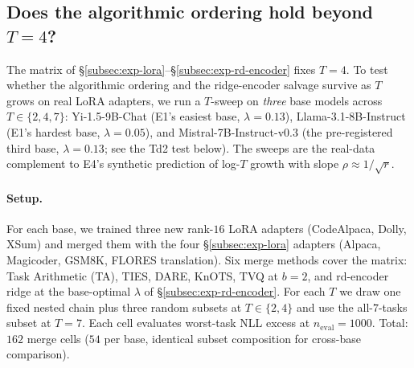 
\subsection{Does the algorithmic ordering hold beyond $T=4$?}
\label{subsec:exp-T-scaling}

The matrix of \S\ref{subsec:exp-lora}--\S\ref{subsec:exp-rd-encoder}
fixes $T=4$. To test whether the algorithmic ordering and the
ridge-encoder salvage survive as $T$ grows on real LoRA adapters, we
run a $T$-sweep on \emph{three} base models across $T \in \{2, 4, 7\}$:
Yi-1.5-9B-Chat (E1's easiest base, $\lambda = 0.13$),
Llama-3.1-8B-Instruct (E1's hardest base, $\lambda = 0.05$), and
Mistral-7B-Instruct-v0.3 (the pre-registered third base, $\lambda =
0.13$; see the Td2 test below). The sweeps are the real-data
complement to E4's synthetic prediction of log-$T$ growth with slope
$\rho \approx 1 / \sqrt{r}$.

\paragraph{Setup.} For each base, we trained three new rank-$16$ LoRA
adapters (CodeAlpaca, Dolly, XSum) and merged them with the four
\S\ref{subsec:exp-lora} adapters (Alpaca, Magicoder, GSM8K, FLORES
translation). Six merge methods cover the matrix: Task Arithmetic
(TA), TIES, DARE, KnOTS, TVQ at $b=2$, and rd-encoder ridge at the
base-optimal $\lambda$ of \S\ref{subsec:exp-rd-encoder}. For each $T$
we draw one fixed nested chain plus three random subsets at
$T \in \{2, 4\}$ and use the all-$7$-tasks subset at $T = 7$. Each
cell evaluates worst-task NLL excess at $n_{\text{eval}} = 1000$.
Total: $162$ merge cells ($54$ per base, identical subset
composition for cross-base comparison).

